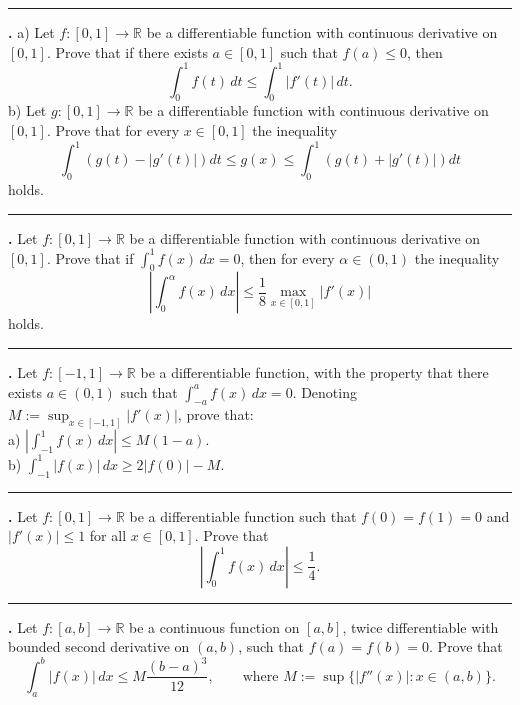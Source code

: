 \documentclass[11pt]{article}
\newcounter{probnum}
\newenvironment{problembox}{\par\noindent\rule{\linewidth}{0.5pt}\vspace{5pt}\par}{\vspace{2pt}}
\begin{document}
\begin{problembox}
\textbf{\theprobnum.} a) Let $f : [0,1] \to \mathbb{R}$ be a differentiable function with continuous derivative on $[0,1]$. Prove that if there exists $a \in [0,1]$ such that $f(a) \le 0$, then
\[
\int_0^1 f(t)\,dt \le \int_0^1 |f'(t)|\,dt.
\]
b) Let $g : [0,1] \to \mathbb{R}$ be a differentiable function with continuous derivative on $[0,1]$. Prove that for every $x \in [0,1]$ the inequality
\[
\int_0^1 \left(g(t) - |g'(t)|\right) dt \le g(x) \le \int_0^1 \left(g(t) + |g'(t)|\right) dt
\]
holds.
\end{problembox}

\begin{problembox}
\textbf{\theprobnum.} Let $f : [0,1] \to \mathbb{R}$ be a differentiable function with continuous derivative on $[0,1]$. Prove that if $\displaystyle\int_0^1 f(x)\,dx = 0$, then for every $\alpha \in (0,1)$ the inequality
\[
\left|\int_0^{\alpha} f(x)\,dx\right| \le \frac{1}{8} \max_{x \in [0,1]} |f'(x)|
\]
holds.
\end{problembox}

\begin{problembox}
\textbf{\theprobnum.} Let $f : [-1,1] \to \mathbb{R}$ be a differentiable function, with the property that there exists $a \in (0,1)$ such that $\displaystyle\int_{-a}^{a} f(x)\,dx = 0$. Denoting $M := \sup_{x \in [-1,1]} |f'(x)|$, prove that:\\
a) $\left|\displaystyle\int_{-1}^{1} f(x)\,dx\right| \le M(1-a)$.\\
b) $\displaystyle\int_{-1}^{1} |f(x)|\,dx \ge 2|f(0)| - M$.
\end{problembox}

\begin{problembox}
\textbf{\theprobnum.} Let $f : [0,1] \to \mathbb{R}$ be a differentiable function such that $f(0)=f(1)=0$ and $|f'(x)| \le 1$ for all $x \in [0,1]$. Prove that
\[
\left|\int_0^1 f(x)\,dx\right| \le \frac{1}{4}.
\]
\end{problembox}

\begin{problembox}
\textbf{\theprobnum.} Let $f : [a,b] \to \mathbb{R}$ be a continuous function on $[a,b]$, twice differentiable with bounded second derivative on $(a,b)$, such that $f(a)=f(b)=0$. Prove that
\[
\int_a^b |f(x)|\,dx \le M \frac{(b-a)^3}{12}, \qquad \text{where } M := \sup\{|f''(x)| : x \in (a,b)\}.
\]
\end{problembox}
\end{document}
